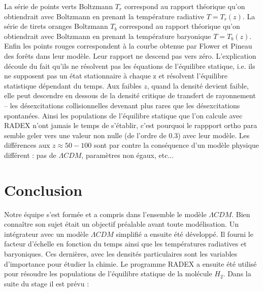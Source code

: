 \documentclass[10pt, a4paper]{report}
\numberwithin{equation}{subsection}
\begin{document}
La série de points verts Boltzmann $T_r$ correspond au rapport théorique qu'on obtiendrait avec Boltzmann en prenant la température radiative $T=T_r(z)$.
La série de tirets oranges Boltzmann $T_b$ correspond au rapport théorique qu'on obtiendrait avec Boltzmann en prenant la température baryonique $T=T_b(z)$.
Enfin les points rouges correspondent à la courbe obtenue par Flower et Pineau des forêts dans leur modèle. 
Leur rapport ne descend pas vers zéro. L’explication découle du fait qu’ils ne résolvent pas les équations de l’équilibre statique, i.e. ils ne supposent pas un état stationnaire à chaque z et résolvent l’équilibre statistique dépendant du temps. Aux faibles $z$, quand la densité devient faible, elle peut descendre en dessous de la densité critique de transfert de rayonnement -- les désexcitations collisionnelles devenant plus rares que les désexcitations spontanées. Ainsi les populations de l'équilibre statique que l'on calcule avec RADEX n'ont jamais le temps de s'établir, c'est pourquoi le rappport ortho para semble geler vers une valeur non nulle (de l’ordre de 0.3) avec leur modèle. Les différences aux $z \approx 50 - 100$ sont par contre la conséquence d'un modèle physique différent : pas de $\Lambda CDM$, paramètres non égaux, etc...

\section*{Conclusion}
Notre équipe s'est formée et a compris dans l'ensemble le modèle $\Lambda CDM$. Bien connaître son sujet était un objectif préalable avant toute modélisation. Un intégrateur avec un modèle $\Lambda CDM$ simplifié a ensuite été développé. Il fourni le facteur d'échelle en fonction du temps ainsi que les températures radiatives et baryoniques. Ces dernières, avec les densités particulaires sont les variables d'importance pour étudier la chimie. Le programme RADEX a ensuite été utilisé pour résoudre les populations de l'équilibre statique de la molécule $H_2$. Dans la suite du stage il est prévu :
\end{document}
